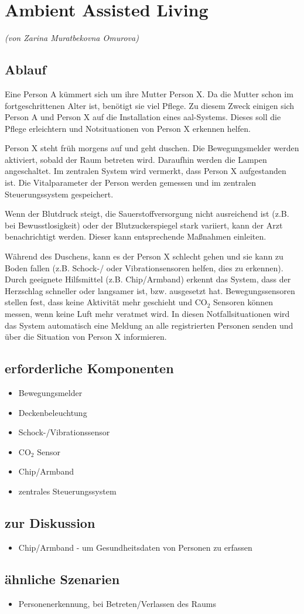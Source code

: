 \section{Ambient Assisted Living}
\emph{(von Zarina Muratbekovna Omurova)}
\subsection{Ablauf}
Eine Person A kümmert sich um ihre Mutter Person X. Da die Mutter schon im fortgeschrittenen Alter ist, benötigt sie viel Pflege. Zu diesem Zweck einigen sich Person A und Person X auf die Installation eines \gls{aal}-Systems. Dieses soll die Pflege erleichtern und Notsituationen von Person X erkennen helfen.

Person X steht früh morgens auf und geht duschen. Die Bewegungsmelder werden aktiviert, sobald der Raum betreten wird. Daraufhin werden die Lampen angeschaltet. Im zentralen System wird vermerkt, dass Person X aufgestanden ist. Die Vitalparameter der Person werden gemessen und im zentralen Steuerungssystem gespeichert. 

Wenn der Blutdruck steigt, die Sauerstoffversorgung nicht ausreichend ist (z.B. bei Bewusstlosigkeit) oder der Blutzuckerspiegel stark variiert, kann der Arzt benachrichtigt werden. Dieser kann entsprechende Maßnahmen einleiten. 

Während des Duschens, kann es der Person X schlecht gehen und sie kann zu Boden fallen (z.B. Schock-/ oder Vibrationsensoren helfen, dies zu erkennen). Durch geeignete Hilfsmittel (z.B. Chip/Armband) erkennt das System, dass der Herzschlag schneller oder langsamer ist, bzw. ausgesetzt hat. Bewegungssensoren stellen fest, dass keine Aktivität mehr geschieht und CO$_2$ Sensoren können messen, wenn keine Luft mehr veratmet wird. In diesen Notfallsituationen wird das System automatisch eine Meldung an alle registrierten Personen senden und über die Situation von Person X informieren.

\subsection{erforderliche Komponenten}
\begin{itemize}
	\item Bewegungsmelder
	\item Deckenbeleuchtung
	\item Schock-/Vibrationssensor
	\item CO$_2$ Sensor
	\item Chip/Armband
	\item zentrales Steuerungssystem
\end{itemize}

\subsection{zur Diskussion}
\begin{itemize}
	\item Chip/Armband - um Gesundheitsdaten von Personen zu erfassen
\end{itemize}

\subsection{ähnliche Szenarien}
\begin{itemize}
	\item Personenerkennung, bei Betreten/Verlassen des Raums
\end{itemize}
